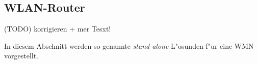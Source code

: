 \newpage
\subsection{WLAN-Router}
(TODO) korrigieren + mer Tesxt!

In diesem Abschnitt werden so genannte \emph{stand-alone} L"osunden f"ur eine WMN vorgestellt.



